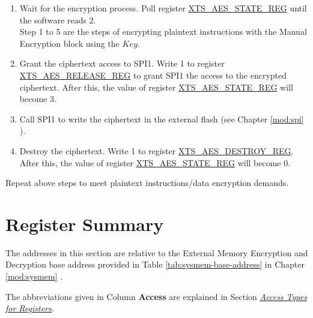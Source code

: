 \documentclass[main\_\_EN.tex]{subfiles}
\begin{document}
\begin{enumerate}
    \item Wait for the encryption process. Poll register \hyperref[regdesc:XTSAESSTATEREG]{XTS\_AES\_STATE\_REG} until the software reads 2. \\Step 1 to 5 are the steps of encrypting plaintext instructions with the Manual Encryption block using the \begin{math}Key\end{math}.

    \item Grant the ciphertext access to SPI1. Write 1 to register \hyperref[regdesc:XTSAESRELEASEREG]{XTS\_AES\_RELEASE\_REG} to grant SPI1 the access to the encrypted ciphertext. After this, the value of register \hyperref[regdesc:XTSAESSTATEREG]{XTS\_AES\_STATE\_REG} will become 3.

    \item Call SPI1 to write the ciphertext in the external flash (see Chapter \ref{mod:spi} \textit{}).

    \item Destroy the ciphertext. Write 1 to register \hyperref[regdesc:XTSAESDESTROYREG]{XTS\_AES\_DESTROY\_REG}. After this, the value of register \hyperref[regdesc:XTSAESSTATEREG]{XTS\_AES\_STATE\_REG} will become 0.

\end{enumerate}

Repeat above steps to meet plaintext instructions/data encryption demands.



\clearpage
\section{Register Summary}
\label{sec:extmemencr-reg-summ}
\hypertarget{extmemencr-reg-summ}{}

The addresses in this section are relative to the External Memory Encryption and Decryption base address provided in Table \ref{tab:sysmem-base-address} in Chapter \ref{mod:sysmem} \textit{}.

The abbreviations given in Column \textbf{Access} are explained in Section \hyperref[glossary-access-types]{\textit{Access Types for Registers}}.


\end{document}
